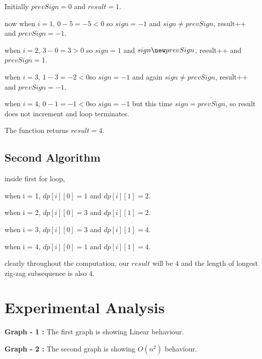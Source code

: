 \documentclass[conference]{IEEEtran}
\begin{document}
Initially $prevSign=0$ and $result =1$.

now when $i=1$, $0-5=-5 < 0 $ so $sign = -1$ and $sign\neq prevSign$, result++ and $prevSign=-1$.

when $i=2$, $3-0=3 > 0$ so $sign = 1$ and $sign\new prevSign$, result++ and $prevSign=1$.

when $i=3$, $1-3=-2<0$so $sign=-1$ and again $sign\neq prevSign$, result++ and $prevSign=-1$.

when $i=4$, $0-1=-1<0$so $sign=-1$ but this time $sign=prevSign$, so result does not increment and loop terminates.

The function returns $result=4$.

\subsection{Second Algorithm}
inside first for loop,

when i = 1, $dp[i][0] = 1$ and $dp[i][1] =2$.

when i = 2, $dp[i][0] = 3$ and $dp[i][1] = 2$.

when i = 3, $dp[i][0] = 3$ and $dp[i][1] = 4$.

when i = 4, $dp[i][0] = 1$ and $dp[i][1] = 4$.

clearly throughout the computation, our $result$ will be $4$ and the length of longest zig-zag subsequence is also $4$.

\section{Experimental Analysis}


\textbf{Graph - 1 : } The first graph is showing Linear behaviour.

\textbf{Graph - 2 : } The second graph is showing $O(n^2)$ behaviour.

\begin{flushleft}

\end{flushleft}
\end{document}
